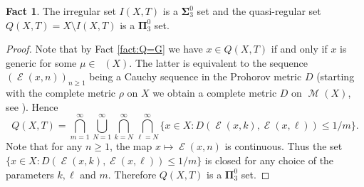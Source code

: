 \documentclass{amsart}
\theoremstyle{definition}
\newtheorem{fact}[thm]{Fact}
\newcommand{\cE}{\mathcal{E}}
\newcommand{\cC}{\mathcal{C}}
\newcommand{\bP}{\boldsymbol{\Pi}}
\newcommand{\bS}{\boldsymbol{\Sigma}}
\DeclareMathOperator{\Emp}{\mathcal{E}}%
\DeclareMathOperator{\M}{\mathcal{M}}
\DeclareMathOperator{\MT}{\mathcal{M}_{\mathit T} }
\begin{document}
\begin{fact} \label{upper:irregular}
The irregular set $I(X,T)$ is a $\bS^0_3$ set and the
quasi-regular set $Q(X,T)=X\setminus I(X,T)$ is a $\bP^0_3$ set.
\end{fact}
\begin{proof}
Note that by Fact \ref{fact:Q=G} we have $x\in Q(X,T)$ if and only if $x$ is generic for some $\mu\in\MT(X)$. The latter is equivalent to
the sequence $(\Emp(x,n))_{n\ge 1}$ being a Cauchy sequence in the Prohorov metric $D$ (starting with the complete metric $\rho$ on $X$ we obtain a complete metric $D$ on $\M(X)$, see \cite[Cor. 18.6.3]{Garling}). Hence
\[
Q(X,T)=\bigcap_{m=1}^\infty\bigcup_{N=1}^\infty \bigcap_{k= N}^\infty
\bigcap_{\ell= N}^\infty \{ x \in X \colon D(\Emp(x, k), \Emp(x,\ell))  \le 1/m \}.
\]
Note that for any $n \geq 1$, the map $x \mapsto \Emp(x, n)$ is continuous. Thus the set $\{ x \in X \colon D(\Emp(x, k), \Emp(x,\ell))  \le 1/m \}$ is closed for any choice of the parameters $k,\ell$ and $m$. Therefore $Q(X,T)$ is a $\bP^0_3$ set.
\end{proof}

\end{document}
